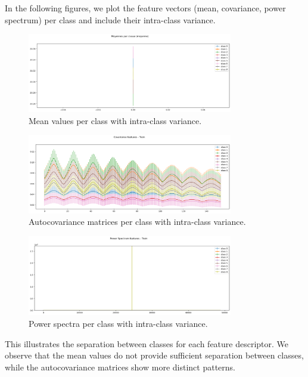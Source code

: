 \documentclass[12pt,a4paper]{article}
\begin{document}
In the following figures, we plot the feature vectors (mean, covariance, power spectrum) per class and include their intra-class variance.
\begin{figure}[H]
    \centering
    \includegraphics[width=0.8\textwidth]{src/mean_per_class.png}
    \caption{Mean values per class with intra-class variance.}
    \label{fig:mean_per_class}
\end{figure}
\begin{figure}[H]
    \centering
    \includegraphics[width=0.8\textwidth]{src/autocovariance_per_class.png}
    \caption{Autocovariance matrices per class with intra-class variance.}
    \label{fig:autocovariance_per_class}
\end{figure}
\begin{figure}[H]
    \centering
    \includegraphics[width=0.8\textwidth]{src/power_spectrum_per_class.png}
    \caption{Power spectra per class with intra-class variance.}
    \label{fig:power_spectrum_per_class}
\end{figure}

This illustrates the separation between classes for each feature descriptor.
We observe that the mean values do not provide sufficient separation between classes, while the autocovariance matrices show more distinct patterns.
\end{document}
